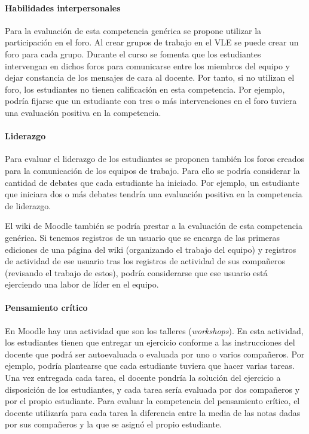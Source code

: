 				\paragraph*{Habilidades interpersonales}
				Para la evaluación de esta competencia genérica se propone utilizar la participación en el foro. Al crear grupos de trabajo en el VLE se puede crear un foro para cada grupo. Durante el curso se fomenta que los estudiantes intervengan en dichos foros para comunicarse entre los miembros del equipo y dejar constancia de los mensajes de cara al docente. Por tanto, si no utilizan el foro, los estudiantes no tienen calificación en esta competencia. Por ejemplo, podría fijarse que un estudiante con tres o más intervenciones en el foro tuviera una evaluación positiva en la competencia.

				\paragraph*{Liderazgo}
				Para evaluar el liderazgo de los estudiantes se proponen también los foros creados para la comunicación de los equipos de trabajo. Para ello se podría considerar la cantidad de debates que cada estudiante ha iniciado. Por ejemplo, un estudiante que iniciara dos o más debates tendría una evaluación positiva en la competencia de liderazgo.

				El wiki de Moodle también se podría prestar a la evaluación de esta competencia genérica. Si tenemos registros de un usuario que se encarga de las primeras ediciones de una página del wiki (organizando el trabajo del equipo) y registros de actividad de ese usuario tras los registros de actividad de sus compañeros (revisando el trabajo de estos), podría considerarse que ese usuario está ejerciendo una labor de líder en el equipo.

				\paragraph*{Pensamiento crítico}
				En Moodle hay una actividad que son los talleres (\emph{workshops}). En esta actividad, los estudiantes tienen que entregar un ejercicio conforme a las instrucciones del docente que podrá ser autoevaluada o evaluada por uno o varios compañeros. Por ejemplo, podría plantearse que cada estudiante tuviera que hacer varias tareas. Una vez entregada cada tarea, el docente pondría la solución del ejercicio a disposición de los estudiantes, y cada tarea sería evaluada por dos compañeros y por el propio estudiante. Para evaluar la competencia del pensamiento crítico, el docente utilizaría para cada tarea la diferencia entre la media de las notas dadas por sus compañeros y la que se asignó el propio estudiante.

